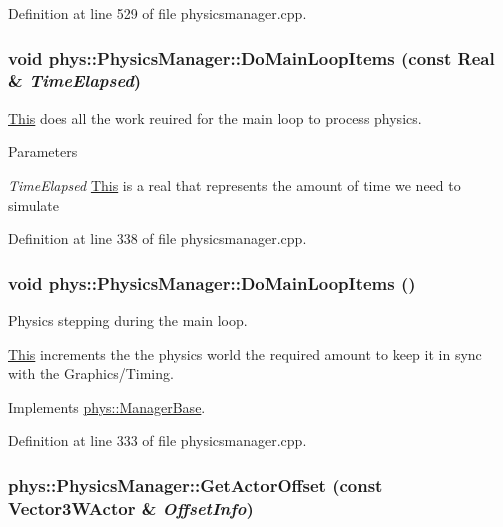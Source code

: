Definition at line 529 of file physicsmanager.cpp.

\hypertarget{classphys_1_1PhysicsManager_ad363d6683a0276395eeb2c42a56f95fc}{
\subsubsection[{DoMainLoopItems}]{\setlength{\rightskip}{0pt plus 5cm}void phys::PhysicsManager::DoMainLoopItems (const {\bf Real} \& {\em TimeElapsed})}}
\label{d3/dcc/classphys_1_1PhysicsManager_ad363d6683a0276395eeb2c42a56f95fc}


\hyperlink{structThis}{This} does all the work reuired for the main loop to process physics. 


\begin{DoxyParams}{Parameters}
\item[{\em TimeElapsed}]\hyperlink{structThis}{This} is a real that represents the amount of time we need to simulate \end{DoxyParams}


Definition at line 338 of file physicsmanager.cpp.

\hypertarget{classphys_1_1PhysicsManager_a62741a2582ac9bfd0255cf8a3ad2310c}{
\subsubsection[{DoMainLoopItems}]{\setlength{\rightskip}{0pt plus 5cm}void phys::PhysicsManager::DoMainLoopItems ()}}
\label{d3/dcc/classphys_1_1PhysicsManager_a62741a2582ac9bfd0255cf8a3ad2310c}


Physics stepping during the main loop. 

\hyperlink{structThis}{This} increments the the physics world the required amount to keep it in sync with the Graphics/Timing. 

Implements \hyperlink{classphys_1_1ManagerBase_aa9e13a3f7c398b708f0f242610b5abf7}{phys::ManagerBase}.



Definition at line 333 of file physicsmanager.cpp.

\hypertarget{classphys_1_1PhysicsManager_a54a48fdfd9db914c25a0f892c2f56301}{
\subsubsection[{GetActorOffset}]{ phys::PhysicsManager::GetActorOffset (const {\bf Vector3WActor} \& {\em OffsetInfo})}}
\label{d3/dcc/classphys_1_1PhysicsManager_a54a48fdfd9db914c25a0f892c2f56301}



